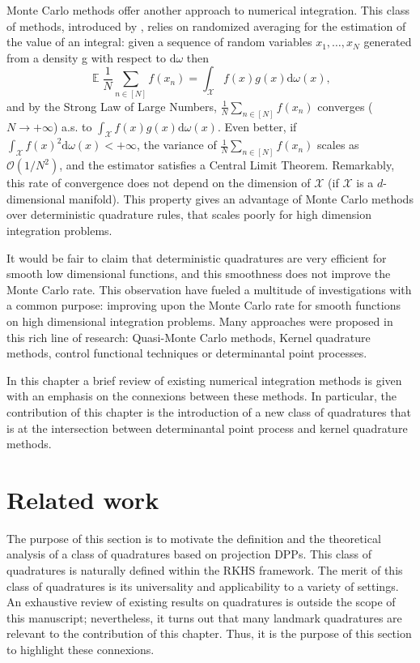 \documentclass[twoside,11pt]{book}
\numberwithin{theorem}{chapter}
\numberwithin{definition}{chapter}
\numberwithin{proposition}{chapter}
\numberwithin{corollary}{chapter}
\numberwithin{example}{chapter}
\numberwithin{lemma}{chapter}
\DeclareMathOperator{\EX}{\mathbb{E}}
\begin{document}
Monte Carlo methods offer another approach to numerical integration. This class of methods, introduced by \cite{MeUl49},  relies on randomized averaging for the estimation of the value of an integral: given a sequence of random variables $x_{1}, \dots, x_{N}$ generated from a density g with respect to $\mathrm{d}\omega$ then
\begin{equation}
\EX \frac{1}{N}\sum\limits_{n \in [N]} f(x_{n}) = \int_{\mathcal{X}} f(x)g(x) \mathrm{d}\omega(x),
\end{equation}
and by the Strong Law of Large Numbers, $\displaystyle \frac{1}{N}\sum\limits_{n \in [N]} f(x_{n})$ converges ($N \rightarrow +\infty$) a.s. to $\displaystyle \int_{\mathcal{X}} f(x)g(x) \mathrm{d}\omega(x)$. Even better, if $\displaystyle \int_{\mathcal{X}} f(x)^{2} \mathrm{d}\omega(x) < +\infty$, the variance of $\displaystyle \frac{1}{N}\sum\limits_{n \in [N]} f(x_{n})$ scales as $\mathcal{O}(1/N^{2})$, and the estimator satisfies a Central Limit Theorem. 
Remarkably, this rate of convergence does not depend on the dimension of $\mathcal{X}$ (if $\mathcal{X}$ is a $d$-dimensional manifold). This property gives an advantage of Monte Carlo methods over deterministic quadrature rules, that scales poorly for high dimension integration problems. 

It would be fair to claim that deterministic quadratures are very efficient for smooth low dimensional functions, and this smoothness does not improve the Monte Carlo rate. This observation have fueled a multitude of investigations with a common purpose: improving upon the Monte Carlo rate for smooth functions on high dimensional integration problems. Many approaches were proposed in this rich line of research: Quasi-Monte Carlo methods, Kernel quadrature methods, control functional techniques or  determinantal point processes.

In this chapter a brief review of existing numerical integration methods is given with an emphasis on the connexions between these methods. In particular, the contribution of this chapter is the introduction of a new class of quadratures that is at the intersection between determinantal point process and kernel quadrature methods.



\section{Related work}
The purpose of this section is to motivate the definition and the theoretical analysis of a class of quadratures based on projection DPPs. This class of quadratures is naturally defined within the RKHS framework. The merit of this class of quadratures is its universality and applicability to a variety of settings. An exhaustive review of existing results on quadratures is outside the scope of this manuscript; nevertheless, it turns out that many landmark quadratures are relevant to the contribution of this chapter. 
Thus, it is the purpose of this section to highlight these connexions.
\end{document}
